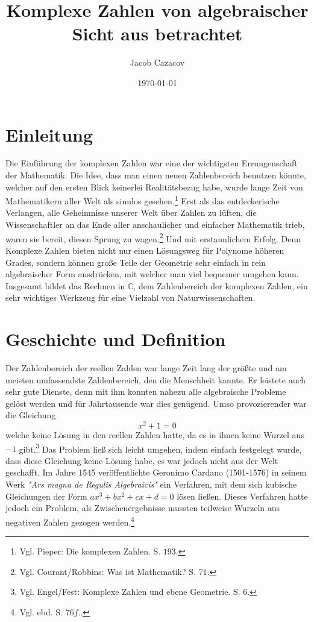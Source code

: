 \documentclass[a4paper,12pt]{article} %
\author{Jacob Cazacov}
\title{Komplexe Zahlen von algebraischer Sicht aus betrachtet}
\date{\today}
\begin{document}

\maketitle

\thispagestyle{empty}

\newpage

\thispagestyle{empty}


\tableofcontents

\newpage


\section{Einleitung}

Die Einführung der komplexen Zahlen war eine der wichtigsten Errungenschaft der Mathematik.
Die Idee, dass man einen neuen Zahlenbereich benutzen könnte, welcher auf den ersten Blick keinerlei Realitätsbezug habe, wurde lange Zeit von Mathematikern aller Welt als sinnlos gesehen.\footnote{Vgl. Pieper: Die komplexen Zahlen. S. $193$.}
Erst als das entdeckerische Verlangen, alle Geheimnisse unserer Welt über Zahlen zu lüften, die Wissenschaftler an das Ende aller anschaulicher und einfacher Mathematik trieb, waren sie bereit, diesen Sprung zu wagen.\footnote{Vgl. Courant/Robbins: Was ist Mathematik? S. $71$.}
Und mit erstaunlichem Erfolg.
Denn Komplexe Zahlen bieten nicht nur einen Lösungsweg für Polynome höheren Grades, sondern können große Teile der Geometrie sehr einfach in rein algebraischer Form ausdrücken, mit welcher man viel bequemer umgehen kann.
Insgesamt bildet das Rechnen in $\mathbb{C}$, dem Zahlenbereich der komplexen Zahlen, ein sehr wichtiges Werkzeug für eine Vielzahl von Naturwissenschaften.

\section{Geschichte und Definition}

Der Zahlenbereich der reellen Zahlen war lange Zeit lang der größte und am meisten umfassendste Zahlenbereich, den die Menschheit kannte.
Er leistete auch sehr gute Dienste, denn mit ihm konnten nahezu alle algebraische Probleme gelöst werden und für Jahrtausende war dies genügend.
Umso provozierender war die Gleichung 
\[x^2+1=0\]
welche keine Lösung in den reellen Zahlen hatte, da es in ihnen keine Wurzel aus $-1$ gibt.\footnote{Vgl. Engel/Fest: Komplexe Zahlen und ebene Geometrie. S. $6$.}
Das Problem ließ sich leicht umgehen, indem einfach festgelegt wurde, dass diese Gleichung keine Lösung habe, es war jedoch nicht aus der Welt geschafft.
Im Jahre 1545 veröffentlichte Geronimo Cardano (1501-1576) in seinem Werk \emph{"{Ars} magna de Regulis Algebraicis"} ein Verfahren, mit dem sich kubische Gleichungen der Form $ax^3+bx^2+cx+d=0$ lösen ließen.
Dieses Verfahren hatte jedoch ein Problem, als Zwischenergebnisse mussten teilweise Wurzeln aus negativen Zahlen gezogen werden.\footnote{Vgl. ebd. S. $76 f.$.} 
\end{document}
